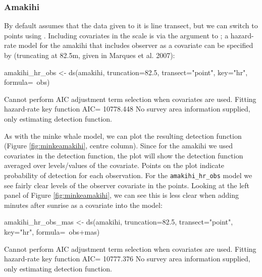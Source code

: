 \documentclass[article]{jss}
\begin{document}
\subsubsection{Amakihi}\label{amakihi-1}

By default  assumes that the data given to it is line transect,
but we can switch to points using . Including
covariates in the scale is via the  argument to
; a hazard-rate model for the amakihi that includes observer as
a covariate can be specified by (truncating at 82.5m, given in Marques
et al. 2007):

\begin{CodeChunk}
\begin{CodeInput}
amakihi_hr_obs <- ds(amakihi, truncation=82.5, transect="point",
                     key="hr", formula=~obs)
\end{CodeInput}
\begin{CodeOutput}
Cannot perform AIC adjustment term selection when covariates are used.
Fitting hazard-rate key function
AIC= 10778.448
No survey area information supplied, only estimating detection function.
\end{CodeOutput}
\end{CodeChunk}

As with the minke whale model, we can plot the resulting detection
function (Figure \ref{fig:minkeamakihi}, centre column). Since for the
amakihi we used covariates in the detection function, the plot will show
the detection function averaged over levels/values of the covariate.
Points on the plot indicate probability of detection for each
observation. For the \texttt{amakihi\_hr\_obs} model we see fairly clear
levels of the observer covariate in the points. Looking at the left
panel of Figure \ref{fig:minkeamakihi}, we can see this is less clear
when adding minutes after sunrise as a covariate into the model:

\begin{CodeChunk}
\begin{CodeInput}
amakihi_hr_obs_mas <- ds(amakihi, truncation=82.5, transect="point",
                         key="hr", formula=~obs+mas)
\end{CodeInput}
\begin{CodeOutput}
Cannot perform AIC adjustment term selection when covariates are used.
Fitting hazard-rate key function
AIC= 10777.376
No survey area information supplied, only estimating detection function.
\end{CodeOutput}
\end{CodeChunk}
\end{document}
